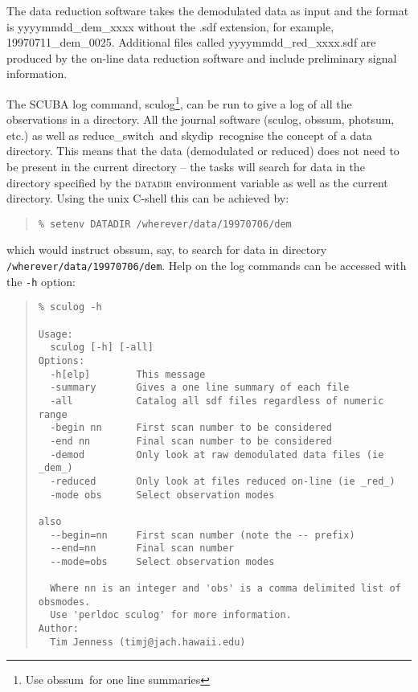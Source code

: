 \documentclass[twoside,11pt,fleqn]{article}
\newenvironment{myquote}{\begin{quote}\begin{small}}{\end{small}\end{quote}}
\newcommand{\task}[1]{{\sf #1}}
\newcommand{\resw}{\xref{\task{reduce\_switch}}{sun216}{REDUCE_SWITCH}}
\newcommand{\skydip}{\xref{\task{skydip}}{sun216}{SKYDIP}}
\newcommand{\sculog}{\xref{\task{sculog}}{sun216}{SCULOG}}
\newcommand{\photsum}{\xref{\task{photsum}}{sun216}{PHOTSUM}}
\newcommand{\obssum}{\xref{\task{obssum}}{sun216}{OBSSUM}}
\newcommand{\xref}[3]{#1}
\begin{document}
The data reduction software takes the demodulated data as input and
the format is yyyymmdd\_dem\_xxxx without the \mbox{.sdf} extension,
for example, 19970711\_dem\_0025.  Additional files called
yyyymmdd\_red\_xxxx\mbox{.sdf} are produced by the on-line data reduction
software and include preliminary signal information.

The SCUBA log command, \sculog\footnote{Use \obssum\ for one line summaries},
can be run to give a log of all the observations in a directory.
All the journal software (\sculog, \obssum, \photsum, etc.)
as well as \resw\ and \skydip\ recognise the concept of a data
directory. This means that the data (demodulated or reduced) does not need
to be present in the current directory -- the tasks will search for data in the
directory specified by the \textsc{datadir} environment variable as well as
the current directory. Using the unix C-shell this can be achieved by:
\begin{myquote}
\begin{verbatim}
% setenv DATADIR /wherever/data/19970706/dem
\end{verbatim}
\end{myquote}
which would instruct \obssum, say, to search for data in directory
\texttt{/wherever/data/19970706\-/dem}.
Help on the log commands
can be accessed with the {\tt -h} option:

\begin{myquote}
\begin{verbatim}
% sculog -h

Usage:
  sculog [-h] [-all]
Options:
  -h[elp]        This message
  -summary       Gives a one line summary of each file
  -all           Catalog all sdf files regardless of numeric range
  -begin nn      First scan number to be considered
  -end nn        Final scan number to be considered
  -demod         Only look at raw demodulated data files (ie _dem_)
  -reduced       Only look at files reduced on-line (ie _red_)
  -mode obs      Select observation modes

also
  --begin=nn     First scan number (note the -- prefix)
  --end=nn       Final scan number
  --mode=obs     Select observation modes

  Where nn is an integer and 'obs' is a comma delimited list of obsmodes.
  Use 'perldoc sculog' for more information.
Author:
  Tim Jenness (timj@jach.hawaii.edu)
\end{verbatim}
\end{myquote}
\end{document}
